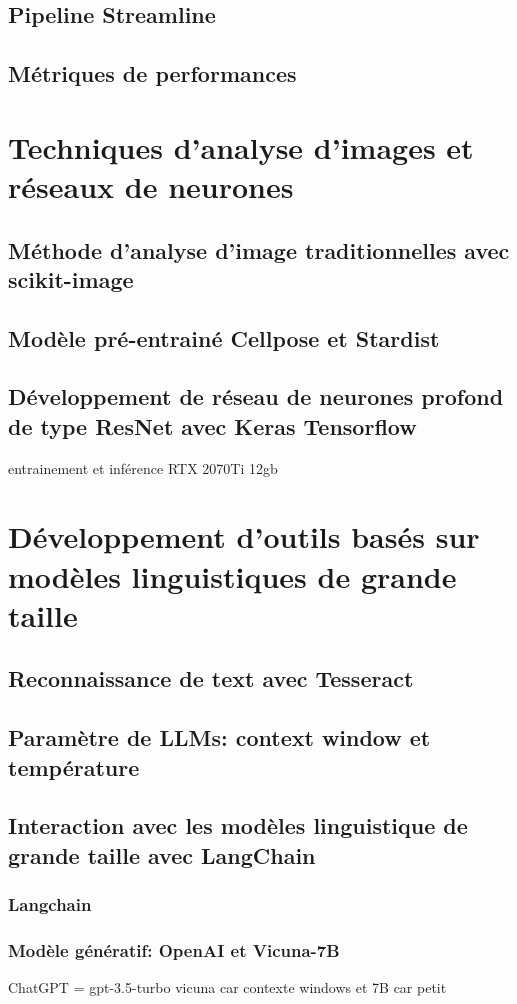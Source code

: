 \subsection{Pipeline Streamline}
\subsection{Métriques de performances}
\section{Techniques d'analyse d'images et réseaux de neurones}
\subsection{Méthode d'analyse d'image traditionnelles avec scikit-image}
\subsection{Modèle pré-entrainé Cellpose et Stardist}
\subsection{Développement de réseau de neurones profond de type ResNet avec Keras Tensorflow}
entrainement et inférence RTX 2070Ti 12gb
\section{Développement d'outils basés sur modèles linguistiques de grande taille}
\subsection{Reconnaissance de text avec Tesseract}
\subsection{Paramètre de LLMs: context window et température}
\subsection{Interaction avec les modèles linguistique de grande taille avec LangChain}
\subsubsection{Langchain}
\subsubsection{Modèle génératif: OpenAI et Vicuna-7B}
ChatGPT = gpt-3.5-turbo
vicuna car contexte windows et 7B car petit
